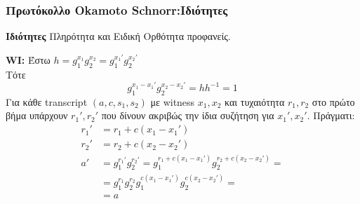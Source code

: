 \documentclass[10pt,handout]{beamer}
\begin{document}
\begin{frame}\frametitle{Πρωτόκολλο Okamoto Schnorr:Ιδιότητες}	 
\textbf{Ιδιότητες}
Πληρότητα και Ειδική Ορθότητα προφανείς.\pause 

\textbf{WI:} Έστω $h=g_1^{x_1}g_2^{x_2}=g_1^{x_1'}g_2^{x_2'}$ \\
	Τότε \[g_1^{x_1-x_1'}g_2^{x_2-x_2'}=hh^{-1}=1\] \pause 
	Για κάθε transcript $(a,c,s_1,s_2)$ με witness $x_1,x_2$ και τυχαιότητα $r_1, r_2$ στο πρώτο βήμα υπάρχουν $r_1',r_2'$ που δίνουν ακριβώς την ίδια συζήτηση για $x_1',x_2'$. Πράγματι: \pause 
	\begin{align*}
		r_1' &= r_1 + c(x_1 - x_1') \\
		r_2' &= r_2+c(x_2-x_2') \\
		a' &= g_1^{r_1'}g_2^{r_2'} = g_1^{r_1+c(x_1-x_1')}g_2^{r_2+c(x_2-x_2')}=\\
		  &=g_1^{r_1}g_2^{r_2} g_1^{c(x_1-x_1')} g_2^{c(x_2-x_2')}=\\
		  &=a
	\end{align*} 
 
\end{frame}

 
\end{document}
